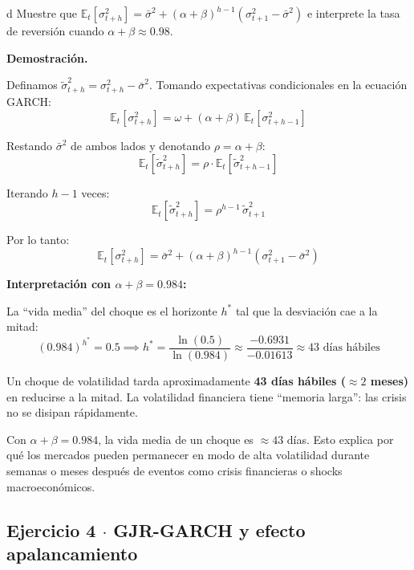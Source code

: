 \documentclass[11pt,a4paper]{article}
\newcommand{\E}{\mathbb{E}}
\newcommand{\sigmabar}{\bar{\sigma}^2}
\begin{document}
\begin{cajaInciso}{d}
Muestre que $\E_t[\sigma^2_{t+h}] = \sigmabar + (\alpha+\beta)^{h-1}(\sigma^2_{t+1} - \sigmabar)$ e interprete la tasa de reversión cuando $\alpha + \beta \approx 0.98$.
\end{cajaInciso}

\textbf{Demostración.}

Definamos $\tilde{\sigma}^2_{t+h} = \sigma^2_{t+h} - \sigmabar$. Tomando expectativas condicionales en la ecuación GARCH:
\[
\E_t[\sigma^2_{t+h}] = \omega + (\alpha+\beta)\,\E_t[\sigma^2_{t+h-1}]
\]

Restando $\sigmabar$ de ambos lados y denotando $\rho = \alpha + \beta$:
\[
\E_t[\tilde{\sigma}^2_{t+h}] = \rho\cdot\E_t[\tilde{\sigma}^2_{t+h-1}]
\]

Iterando $h-1$ veces:
\[
\E_t[\tilde{\sigma}^2_{t+h}] = \rho^{h-1}\,\tilde{\sigma}^2_{t+1}
\]

Por lo tanto:
\[
\boxed{\E_t[\sigma^2_{t+h}] = \sigmabar + (\alpha+\beta)^{h-1}(\sigma^2_{t+1} - \sigmabar)}
\]

\textbf{Interpretación con $\alpha + \beta = 0.984$:}

La ``vida media'' del choque es el horizonte $h^*$ tal que la desviación cae a la mitad:
\[
(0.984)^{h^*} = 0.5 \implies h^* = \frac{\ln(0.5)}{\ln(0.984)} \approx \frac{-0.6931}{-0.01613} \approx 43 \text{ días hábiles}
\]

Un choque de volatilidad tarda aproximadamente \textbf{43 días hábiles ($\approx 2$ meses)} en reducirse a la mitad. La volatilidad financiera tiene ``memoria larga'': las crisis no se disipan rápidamente.

\begin{cajaHallazgo}
Con $\alpha+\beta=0.984$, la vida media de un choque es $\approx 43$ días. Esto explica por qué los mercados pueden permanecer en modo de alta volatilidad durante semanas o meses después de eventos como crisis financieras o shocks macroeconómicos.
\end{cajaHallazgo}

\subsection*{Ejercicio 4 \texorpdfstring{$\cdot$}{·} GJR-GARCH y efecto apalancamiento}
\end{document}
